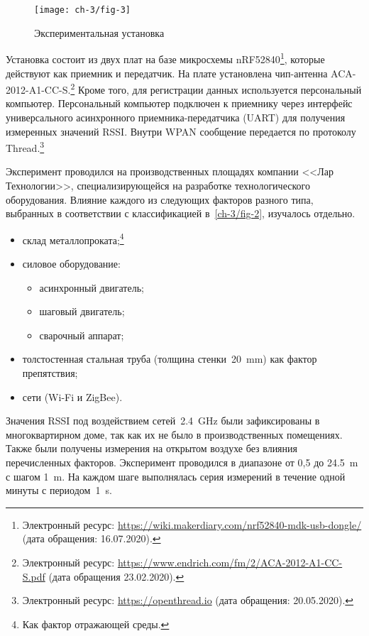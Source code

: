 \begin{figure} [ht]
	\centering
	\texttt{[image: ch-3/fig-3]}
	\caption{Экспериментальная установка}
	\label{ch-3/fig-3}
\end{figure}

Установка состоит из двух плат на базе микросхемы nRF52840\footnote{Электронный ресурс: {\url{https://wiki.makerdiary.com/nrf52840-mdk-usb-dongle/}} (дата обращения: 16.07.2020).}, которые действуют как приемник и передатчик. На плате установлена чип-антенна ACA-2012-A1-CC-S.\footnote{Электронный ресурс: \url{https://www.endrich.com/fm/2/ACA-2012-A1-CC-S.pdf} (дата обращения 23.02.2020).}
Кроме того, для регистрации данных используется персональный компьютер. Персональный компьютер подключен к приемнику через интерфейс универсального асинхронного приемника-передатчика (UART) для получения измеренных значений RSSI. Внутри WPAN сообщение передается по протоколу Thread.\footnote{Электронный ресурс: {\url{https://openthread.io}} (дата обращения: 20.05.2020).}

Эксперимент проводился на производственных площадях компании <<Лар Технологии>>, специализирующейся на разработке технологического оборудования. Влияние каждого из следующих факторов разного типа, выбранных в соответствии с классификацией в~\cref{ch-3/fig-2}, изучалось отдельно.

\begin{itemize}
\item склад металлопроката;\footnote{Как фактор отражающей среды.}
\item силовое оборудование:
	\begin{itemize}
		\item асинхронный двигатель;
		\item шаговый двигатель;
		\item сварочный аппарат;
	\end{itemize}
\item толстостенная стальная труба (толщина стенки~\SI{20}{\milli\meter}) как фактор препятствия;
\item сети (Wi-Fi и ZigBee).
\end{itemize}

Значения RSSI под воздействием сетей~\SI{2,4}{\giga\hertz} были зафиксированы в многоквартирном доме, так как их не было в производственных помещениях. Также были получены измерения на открытом воздухе без влияния перечисленных факторов. Эксперимент проводился в диапазоне от 0,5 до \SI{24,5}{\meter} с шагом \SI{1}{\meter}. На каждом шаге выполнялась серия измерений в течение одной минуты с периодом~\SI{1}{\second}.

